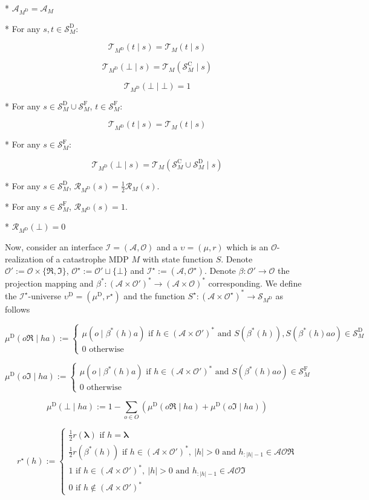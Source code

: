 \documentclass[a4paper]{article}
\newcommand{\AP}[1]{\left(#1\right)}
\newcommand{\Estr}{\boldsymbol{\lambda}}
\newcommand{\Abs}[1]{\left\vert #1 \right\vert}
\newcommand{\Ob}{\mathcal{O}}
\newcommand{\A}{\mathcal{A}}
\newcommand{\St}{\mathcal{S}}
\newcommand{\T}{\mathcal{T}}
\newcommand{\R}{\mathcal{R}}
\newcommand{\In}{\mathcal{I}}
\newcommand{\RMC}{\mathrm{C}}
\newcommand{\RMD}{\mathrm{D}}
\newcommand{\RMF}{\mathrm{F}}
\newcommand{\SF}{\St^{\RMF}}
\newcommand{\SD}{\St^{\RMD}}
\newcommand{\SC}{\St^{\RMC}}
\newcommand{\MD}{M^{\RMD}}
\newcommand{\UD}{\upsilon^{\RMD}}
\begin{document}
* $\A_{\MD} = \A_M$

* For any $s,t \in \SD_M$:

$$\T_{\MD}(t \mid s) = \T_M(t \mid s)$$

$$\T_{\MD}(\bot \mid s) = \T_M(\SC_M \mid s)$$

$$\T_{\MD}(\bot \mid \bot) = 1$$

* For any $s \in \SD_M \cup \SF_M$, $t \in \SF_M$:

$$\T_{\MD}(t \mid s) = \T_M(t \mid s)$$

* For any $s \in \SF_M$:

$$\T_{\MD}(\bot \mid s) = \T_M(\SC_M \cup \SD_M \mid s)$$

* For any $s \in \SD_M$, $\R_{\MD}(s) = \frac{1}{2}\R_M(s)$.

* For any $s \in \SF_M$, $\R_{\MD}(s) = 1$.

* $\R_{\MD}(\bot) = 0$

Now, consider an interface $\In=(\A,\Ob)$ and a $\upsilon=(\mu,r)$ which is an $\Ob$-realization of a catastrophe MDP $M$ with state function $S$. Denote $\Ob':=\Ob\times\{\Re,\Im\}$, $\Ob^\star:=\Ob' \sqcup \{\bot\}$ and $\In^\star:=(\A,\Ob^\star)$. Denote $\beta: \Ob' \rightarrow \Ob$ the projection mapping and $\beta^*: \AP{\A \times \Ob'}^* \rightarrow \AP{\A \times \Ob}^*$ corresponding. We define the $\In^\star$-universe $\UD=(\mu^\RMD,r^\star)$ and the function $S^\star: \AP{\A \times \Ob^\star}^* \rightarrow \St_{\MD}$ as follows

$$\mu^\RMD(o\Re \mid ha) := \begin{cases} \mu\AP{o \mid \beta^*(h)a} \text{ if } h\in\AP{\A \times \Ob'}^* \text{ and } S\AP{\beta^*(h)},S\AP{\beta^*(h)ao}\in\SD_M \\ 0 \text{ otherwise} \end{cases}$$

$$\mu^\RMD(o\Im \mid ha) := \begin{cases} \mu\AP{o \mid \beta^*(h)a} \text{ if } h\in\AP{\A \times \Ob'}^* \text{ and } S\AP{\beta^*(h)ao}\in\SF_M \\ 0 \text{ otherwise} \end{cases}$$

$$\mu^\RMD(\bot \mid ha) := 1 - \sum_{o \in O} \AP{\mu^\RMD(o\Re \mid ha) + \mu^\RMD(o\Im \mid ha)}$$

$$r^\star(h):=\begin{cases} \frac{1}{2}r(\Estr) \text{ if } h = \Estr \\ \frac{1}{2}r\AP{\beta^*(h)} \text{ if } h\in\AP{\A \times \Ob'}^*,\ \Abs{h}>0 \text{ and } h_{:\Abs{h}-1}\in\A\Ob\Re \\ 1 \text{ if } h\in\AP{\A \times \Ob'}^*,\ \Abs{h}>0 \text{ and } h_{:\Abs{h}-1}\in\A\Ob\Im \\ 0 \text{ if } h\not\in\AP{\A \times \Ob'}^* \end{cases}$$
\end{document}
